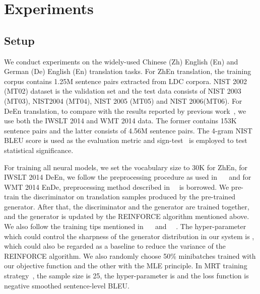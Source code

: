 \documentclass[letterpaper]{article} \usepackage{aaai19}  \usepackage{times}  \usepackage{helvet}  \usepackage{courier}  \usepackage{url}  \usepackage{graphicx}  \frenchspacing  \setlength{\pdfpagewidth}{8.5in}  \setlength{\pdfpageheight}{11in}  \usepackage{amsmath}
\begin{document}
\section{Experiments}

\subsection{Setup}

We conduct experiments on the widely-used Chinese (Zh) English (En) and German (De) English (En) translation tasks. For ZhEn translation, the training corpus contains 1.25M sentence pairs extracted from LDC corpora. NIST 2002 (MT02) dataset is the validation set and the test data consists of NIST 2003 (MT03), NIST2004 (MT04), NIST 2005 (MT05) and NIST 2006(MT06). 
For DeEn translation, to compare with the results reported by previous work~\cite{Shen:2016:ACL,bahdanau2016actor,wu2017adversarial,vaswani2017attention}, we use both the IWSLT 2014 and WMT 2014 data. The former contains 153K sentence pairs and the latter consists of 4.56M sentence pairs.
The 4-gram NIST BLEU score \cite{papineni2002bleu} is used as the evaluation metric and sign-test~\cite{collins2005clause} is employed to test statistical significance. 




For training all neural models, we set the vocabulary size to 30K for ZhEn, for IWSLT 2014 DeEn, we follow the preprocessing procedure as used in ~\citeauthor{Ranzato:2016:ICLR}~ and for WMT 2014 EnDe, preprocessing method described in~\citeauthor{vaswani2017attention}~ is borrowed. We pre-train the discriminator on translation samples produced by the pre-trained generator. After that, the discriminator and the generator are trained together, and the generator is updated by the REINFORCE algorithm mentioned above. We also follow the training tips  mentioned in ~\citeauthor{Shen:2016:ACL}~ and ~\citeauthor{wu2017adversarial}~. The hyper-parameter  which could control the sharpness of the generator distribution in our system is , which could also be regarded as a baseline to reduce the variance of the REINFORCE algorithm. We also randomly choose 50\% minibatches trained with our objective function and the other with the MLE principle.
In MRT training strategy~\cite{Shen:2016:ACL}, the sample size is 25, the hyper-parameter  is  and the loss function is negative smoothed sentence-level BLEU.
\end{document}
